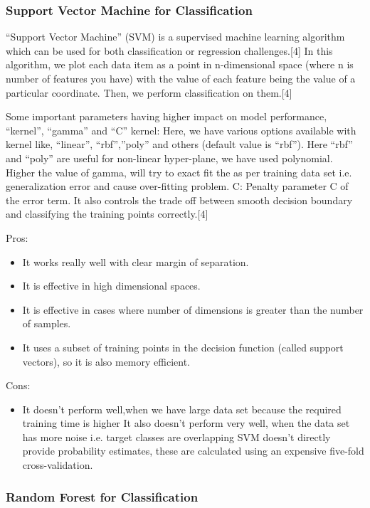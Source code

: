 \documentclass{article}
\begin{document}
\subsubsection {Support Vector Machine for Classification}

“Support Vector Machine” (SVM) is a supervised machine learning algorithm which can be used for both classification or regression challenges.[4] In this algorithm, we plot each data item as a point in n-dimensional space (where n is number of features you have) with the value of each feature being the value of a particular coordinate. Then, we perform classification on them.[4] \newline

Some important parameters having higher impact on model performance, “kernel”, “gamma” and “C”
kernel: Here, we have various options available with kernel like, “linear”, “rbf”,”poly” and others (default value is “rbf”).  Here “rbf” and “poly” are useful for non-linear hyper-plane, we have used polynomial. Higher the value of gamma, will try to exact fit the as per training data set i.e. generalization error and cause over-fitting problem. C: Penalty parameter C of the error term. It also controls the trade off between smooth decision boundary and classifying the training points correctly.[4] \newline

Pros:
\begin{itemize}
\item It works really well with clear margin of separation.
\item It is effective in high dimensional spaces.
\item It is effective in cases where number of dimensions is greater than the number of samples.
\item It uses a subset of training points in the decision function (called support vectors), so it is also memory efficient.
\end{itemize}
Cons:
\begin{itemize}
\item It doesn’t perform well,when we have large data set because the required training time is higher
It also doesn’t perform very well, when the data set has more noise i.e. target classes are overlapping
SVM doesn’t directly provide probability estimates, these are calculated using an expensive five-fold cross-validation. 
\end{itemize}
\subsubsection {Random Forest for Classification}
\end{document}
